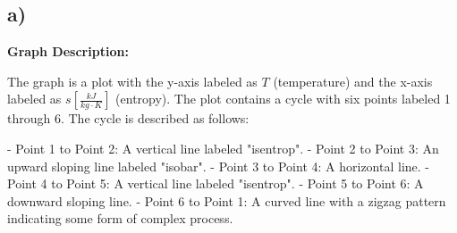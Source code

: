 

\subsection*{a)}

\begin{center}
\textbf{Graph Description:}
\end{center}

The graph is a plot with the y-axis labeled as \( T \) (temperature) and the x-axis labeled as \( s \left[ \frac{kJ}{kg \cdot K} \right] \) (entropy). The plot contains a cycle with six points labeled 1 through 6. The cycle is described as follows:

- Point 1 to Point 2: A vertical line labeled "isentrop".
- Point 2 to Point 3: An upward sloping line labeled "isobar".
- Point 3 to Point 4: A horizontal line.
- Point 4 to Point 5: A vertical line labeled "isentrop".
- Point 5 to Point 6: A downward sloping line.
- Point 6 to Point 1: A curved line with a zigzag pattern indicating some form of complex process.